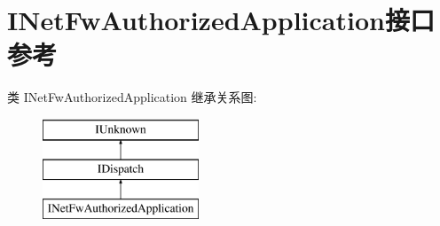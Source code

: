 \hypertarget{interface_i_net_fw_authorized_application}{}\section{I\+Net\+Fw\+Authorized\+Application接口 参考}
\label{interface_i_net_fw_authorized_application}
类 I\+Net\+Fw\+Authorized\+Application 继承关系图\+:\begin{figure}[H]
\begin{center}
\leavevmode
\includegraphics[height=3.000000cm]{interface_i_net_fw_authorized_application}
\end{center}
\end{figure}

